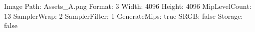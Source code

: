 Image Path: Assets\Meshes\Cerberus\Cerberus_A.png
Format: 3
Width: 4096
Height: 4096
MipLevelCount: 13
SamplerWrap: 2
SamplerFilter: 1
GenerateMips: true
SRGB: false
Storage: false